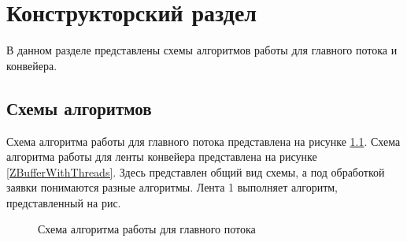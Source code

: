 \chapter{Конструкторский раздел}
В данном разделе представлены схемы алгоритмов работы для главного потока и конвейера.

\section{Схемы алгоритмов}
Схема алгоритма работы для главного потока представлена  на рисунке \ref{ZBufferAlg}.
Схема алгоритма работы для ленты конвейера представлена  на рисунке \ref{ZBufferWithThreads}. Здесь представлен общий вид схемы, а под обработкой заявки понимаются разные алгоритмы. Лента 1 выполняет алгоритм, представленный на рис. %

\begin{figure}
	\caption{Схема алгоритма работы для главного потока}
	\label{ZBufferAlg}
\end{figure}

